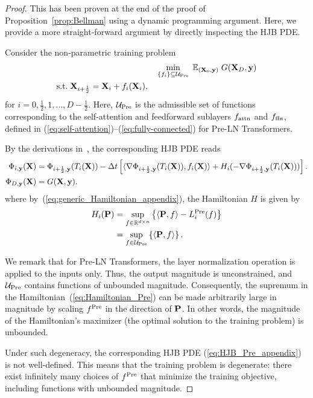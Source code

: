 \documentclass[journal]{IEEEtran}
\def\eqref#1{equation~\ref{#1}}
\newcommand{\bfP}{{\bf P}}
\newcommand{\bfX}{{\bf X}}
\newcommand{\bfy}{ {\bf y}}
\renewcommand{\eqref}[1]{(\ref{#1})}
\theoremstyle{plain}
\theoremstyle{definition}
\theoremstyle{remark}
\begin{document}
\begin{proof}
This has been proven at the end of the proof of Proposition~\ref{prop:Bellman} using a dynamic programming argument. Here, we provide a more straight-forward argument by directly inspecting the HJB PDE.

Consider the non-parametric training problem
\begin{align}\label{eq:PRELN_nonpara_appendix}
    & \min_{\{f_i\} \subseteq \mathcal{U}_{\rm Pre}} \; \mathbb{E}_{(\bfX_0, \bfy)} \; G(\bfX_D, \bfy) \\ 
    \begin{split} &\text{s.t.} \; \bfX_{i+\frac{1}{2}} = \bfX_i + f_i(\bfX_{i}),
\end{split}
\end{align}
for $i=0,\frac{1}{2},1,...,D-\frac{1}{2}$. 
Here, $\mathcal{U}_{\rm Pre}$ is the admissible set of functions corresponding to the self-attention and feedforward sublayers $f_{\rm attn}$ and $f_{\rm ffn}$, defined in (\ref{eq:self-attention})–(\ref{eq:fully-connected}) for Pre-LN Transformers. 

By the derivations in~, the corresponding HJB PDE reads 
\begin{align}\label{eq:HJB_Pre_appendix}
\begin{split}
    \Phi_{i,\bfy}(\bfX) &= \Phi_{i+\frac{1}{2},\bfy}(T_i(\bfX)) - \Delta t\left[ \langle \nabla \Phi_{{i+\frac{1}{2}, \bfy}}(T_i(\bfX)), f_i(\bfX) \rangle + H_i(- \nabla \Phi_{{i+\frac{1}{2}, \bfy}}(T_i(\bfX))) \right]. \\
    \Phi_{D,\bfy}(\bfX) &=G(\bfX, \bfy).
    \end{split}
\end{align}
where by~\eqref{eq:generic_Hamiltonian_appendix}, the Hamiltonian $H$ is given by
\begin{align*}\label{eq:Hamiltonian_Pre}
    H_i(\bfP) &= \sup_{f \in \mathbb{R}^{d \times n}} \left\{ \langle \bfP, f \rangle - L_i^{\rm Pre}(f) \right\} \\
    &= \sup_{f \in \mathcal{U}_{\rm Pre}} \left\{ \langle \bfP, f \rangle \right\}.
\end{align*}

We remark that for Pre-LN Transformers, the layer normalization operation is applied to the inputs only. Thus, the output magnitude is unconstrained, and $\mathcal{U}_{\rm Pre}$ contains functions of unbounded magnitude. Consequently, the supremum in the Hamiltonian~(\ref{eq:Hamiltonian_Pre}) can be made arbitrarily large in magnitude by scaling $f^{\rm Pre}$ in the direction of $\bfP$. In other words, the magnitude of the Hamiltonian's maximizer (the optimal solution to the training problem) is unbounded.

Under such degeneracy, the corresponding HJB PDE (\ref{eq:HJB_Pre_appendix}) is not well-defined. This means that the training problem is degenerate: there exist infinitely many choices of $f^{\rm Pre}$ that minimize the training objective, including functions with unbounded magnitude.
\end{proof}
\end{document}
